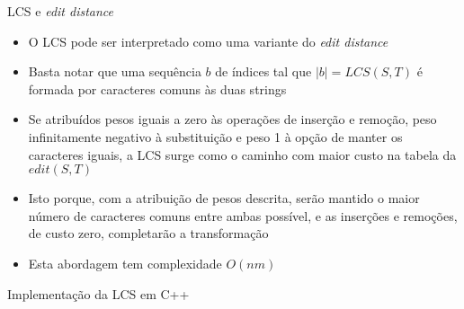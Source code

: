 \begin{frame}[fragile]{LCS e {\it edit distance}}

    \begin{itemize}
        \item O LCS pode ser interpretado como uma variante do \textit{edit distance}

        \item Basta notar que uma sequência $b$ de índices tal que $|b| = LCS(S, T)$ é
            formada por caracteres comuns às duas strings

        \item Se atribuídos pesos iguais a zero às operações de inserção e remoção, peso 
            infinitamente negativo à substituição e peso 1 à opção de manter os caracteres iguais, 
            a LCS surge como o caminho com maior custo na tabela da $edit(S, T)$

        \item Isto porque, com a atribuição de pesos descrita, serão mantido o maior número de
            caracteres comuns entre ambas possível, e as inserções e remoções, de custo zero,
            completarão a transformação

        \item Esta abordagem tem complexidade $O(nm)$
    \end{itemize}

\end{frame}



\begin{frame}[fragile]{Implementação da LCS em C++}
\end{frame}

